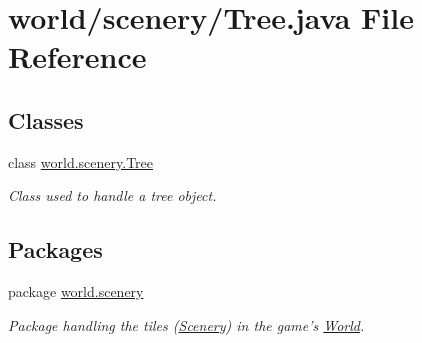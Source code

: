 \hypertarget{a00076}{\section{world/scenery/\-Tree.java File Reference}
\label{a00076}
}
\subsection*{Classes}
\begin{DoxyCompactItemize}
\item 
class \hyperlink{a00033}{world.\-scenery.\-Tree}
\begin{DoxyCompactList}\small\item\em Class used to handle a tree object. \end{DoxyCompactList}\end{DoxyCompactItemize}
\subsection*{Packages}
\begin{DoxyCompactItemize}
\item 
package \hyperlink{a00091}{world.\-scenery}
\begin{DoxyCompactList}\small\item\em Package handling the tiles (\hyperlink{a00024}{Scenery}) in the game's \hyperlink{a00039}{World}. \end{DoxyCompactList}\end{DoxyCompactItemize}
